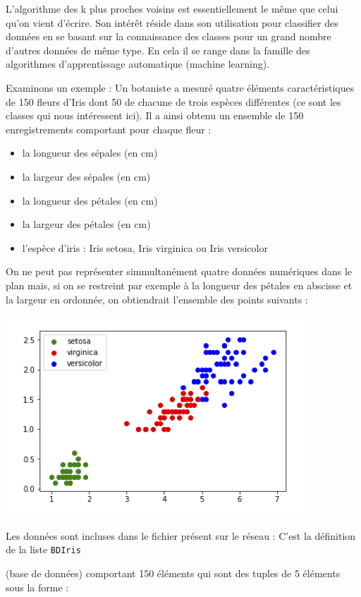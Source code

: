L'algorithme des k plus proches voisins est essentiellement le même que celui qu'on vient d'écrire. Son intérêt réside dans son utilisation pour classifier des données en se basant sur la connaissance des classes pour un grand nombre d'autres données de même type. En cela il se range dans la famille des algorithmes d’apprentissage automatique (machine learning).

Examinons un exemple : Un botaniste a mesuré quatre éléments caractéristiques de 150 fleurs d'Iris dont 50 de chacune de trois espèces différentes (ce sont les classes qui nous intéressent ici). Il a ainsi obtenu un ensemble de 150 enregistrements comportant pour chaque fleur :
\begin{itemize}

   \item   la longueur des sépales (en cm)
  \item     la largeur des sépales (en cm)
    \item   la longueur des pétales (en cm)
    \item   la largeur des pétales (en cm)
    \item   l’espèce d’iris : Iris setosa, Iris virginica ou Iris versicolor
\end{itemize} 
\medskip

On ne peut pas représenter simmultanément quatre données numériques dans le plan mais, si on se restreint par exemple à la longueur des pétales en abscisse et la largeur en ordonnée, on obtiendrait l'ensemble des points suivants :


\begin{center}
\includegraphics[width=10 cm]{Iris_sepales.png}
\end{center}

Les données sont incluses dans le fichier présent sur le réseau : C'est la définition de la liste  \verb+BDIris+

(base de données) comportant 150 éléments qui sont des tuples de 5 éléments sous la forme :

